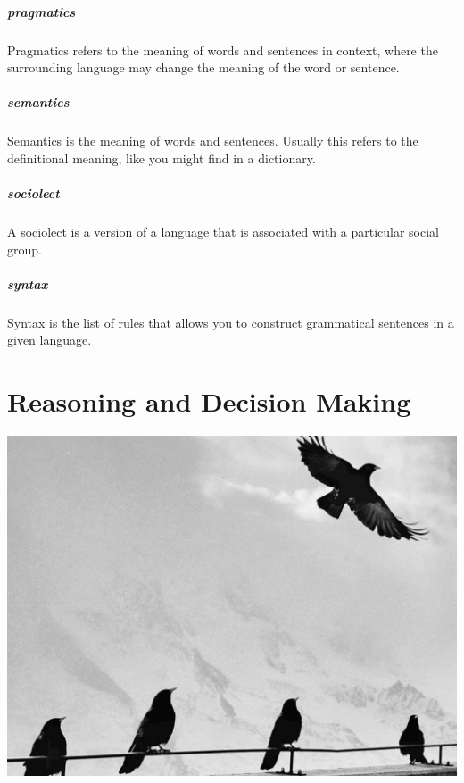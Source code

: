 \documentclass[
]{krantz}
\begin{document}
\paragraph*{pragmatics}\label{pragmatics}

Pragmatics refers to the meaning of words and sentences in context, where the surrounding language may change the meaning of the word or sentence.

\paragraph*{semantics}\label{semantics}

Semantics is the meaning of words and sentences. Usually this refers to the definitional meaning, like you might find in a dictionary.

\paragraph*{sociolect}\label{sociolect}

A sociolect is a version of a language that is associated with a particular social group.

\paragraph*{syntax}\label{syntax}

Syntax is the list of rules that allows you to construct grammatical sentences in a given language.

\chapter{Reasoning and Decision Making}\label{reasoning-and-decision-making}

\begin{center}\includegraphics[width=1\linewidth]{images/ch9/fig0} \end{center}
\end{document}
